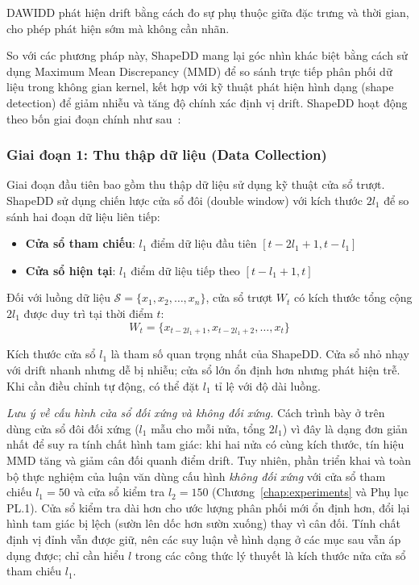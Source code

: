 DAWIDD phát hiện drift bằng cách đo sự phụ thuộc giữa đặc trưng và thời gian, cho phép phát hiện sớm mà không cần nhãn.

So với các phương pháp này, ShapeDD mang lại góc nhìn khác biệt bằng cách sử dụng Maximum Mean Discrepancy (MMD) để so sánh trực tiếp phân phối dữ liệu trong không gian kernel, kết hợp với kỹ thuật phát hiện hình dạng (shape detection) để giảm nhiễu và tăng độ chính xác định vị drift.
ShapeDD hoạt động theo bốn giai đoạn chính như sau~\cite{shapeDD2021}:

\subsubsection{Giai đoạn 1: Thu thập dữ liệu (Data Collection)}

Giai đoạn đầu tiên bao gồm thu thập dữ liệu sử dụng kỹ thuật cửa sổ trượt. ShapeDD sử dụng chiến lược cửa sổ đôi (double window) với kích thước $2l_1$ để so sánh hai đoạn dữ liệu liên tiếp:

\begin{itemize}
	\item \textbf{Cửa sổ tham chiếu}: $l_1$ điểm dữ liệu đầu tiên $[t-2l_1+1, t-l_1]$
	\item \textbf{Cửa sổ hiện tại}: $l_1$ điểm dữ liệu tiếp theo $[t-l_1+1, t]$
\end{itemize}

Đối với luồng dữ liệu $\mathcal{S} = \{x_1, x_2, \ldots, x_n\}$, cửa sổ trượt $W_t$ có kích thước tổng cộng $2l_1$ được duy trì tại thời điểm $t$:
\begin{equation}
	W_t = \{x_{t-2l_1+1}, x_{t-2l_1+2}, \ldots, x_t\}
\end{equation}

Kích thước cửa sổ $l_1$ là tham số quan trọng nhất của ShapeDD. Cửa sổ nhỏ nhạy với drift nhanh nhưng dễ bị nhiễu; cửa sổ lớn ổn định hơn nhưng phát hiện trễ. Khi cần điều chỉnh tự động, có thể đặt $l_1$ tỉ lệ với độ dài luồng.

\textit{Lưu ý về cấu hình cửa sổ đối xứng và không đối xứng.} Cách trình bày ở trên dùng cửa sổ đôi đối xứng ($l_1$ mẫu cho mỗi nửa, tổng $2l_1$) vì đây là dạng đơn giản nhất để suy ra tính chất hình tam giác: khi hai nửa có cùng kích thước, tín hiệu MMD tăng và giảm cân đối quanh điểm drift. Tuy nhiên, phần triển khai và toàn bộ thực nghiệm của luận văn dùng cấu hình \emph{không đối xứng} với cửa sổ tham chiếu $l_1 = 50$ và cửa sổ kiểm tra $l_2 = 150$ (Chương~\ref{chap:experiments} và Phụ lục PL.1). Cửa sổ kiểm tra dài hơn cho ước lượng phân phối mới ổn định hơn, đổi lại hình tam giác bị lệch (sườn lên dốc hơn sườn xuống) thay vì cân đối. Tính chất định vị đỉnh vẫn được giữ, nên các suy luận về hình dạng ở các mục sau vẫn áp dụng được; chỉ cần hiểu $l$ trong các công thức lý thuyết là kích thước nửa cửa sổ tham chiếu $l_1$.

